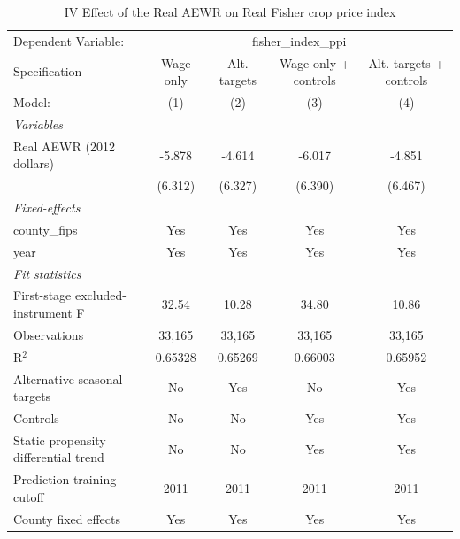 
\begin{table}[htbp]
   \caption{\label{tab:iv_prices} IV Effect of the Real AEWR on Real Fisher crop price index}
   \centering
   \begin{tabular}{lcccc}
      \tabularnewline \midrule \midrule
      Dependent Variable: & \multicolumn{4}{c}{fisher\_index\_ppi}\\
      Specification                        & Wage only & Alt. targets & Wage only + controls & Alt. targets + controls \\   
      Model:                               & (1)       & (2)          & (3)                  & (4)\\  
      \midrule
      \emph{Variables}\\
      Real AEWR (2012 dollars)             & -5.878    & -4.614       & -6.017               & -4.851\\   
                                           & (6.312)   & (6.327)      & (6.390)              & (6.467)\\   
      \midrule
      \emph{Fixed-effects}\\
      county\_fips                         & Yes       & Yes          & Yes                  & Yes\\  
      year                                 & Yes       & Yes          & Yes                  & Yes\\  
      \midrule
      \emph{Fit statistics}\\
      First-stage excluded-instrument F    & 32.54     & 10.28        & 34.80                & 10.86\\  
      Observations                         & 33,165    & 33,165       & 33,165               & 33,165\\  
      R$^2$                                & 0.65328   & 0.65269      & 0.66003              & 0.65952\\  
      Alternative seasonal targets         & No        & Yes          & No                   & Yes\\  
      Controls                             & No        & No           & Yes                  & Yes\\  
      Static propensity differential trend & No        & No           & Yes                  & Yes\\  
      Prediction training cutoff           & 2011      & 2011         & 2011                 & 2011\\  
      County fixed effects                 & Yes       & Yes          & Yes                  & Yes\\  

\end{tabular}
\end{table}
